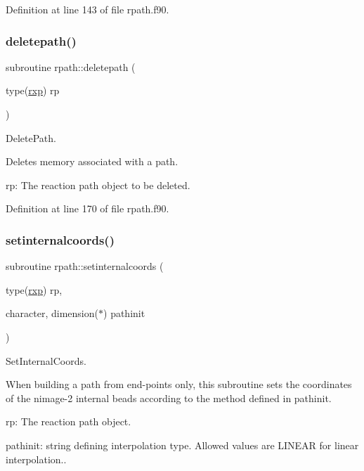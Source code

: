 Definition at line 143 of file rpath.\+f90.

\mbox{\label{namespacerpath_acc28b3649c7753a676d4d6c4e6635286}} 
\subsubsection{\texorpdfstring{deletepath()}{deletepath()}}
{\footnotesize\ttfamily subroutine rpath\+::deletepath (\begin{DoxyParamCaption}\item[{type(\mbox{\hyperlink{structrpath_1_1rxp}{rxp}})}]{rp }\end{DoxyParamCaption})}



Delete\+Path. 

Deletes memory associated with a path.


\begin{DoxyItemize}
\item rp\+: The reaction path object to be deleted. 
\end{DoxyItemize}

Definition at line 170 of file rpath.\+f90.

\mbox{\label{namespacerpath_a14303787a571dd0cb770f37003d45bc6}} 
\subsubsection{\texorpdfstring{setinternalcoords()}{setinternalcoords()}}
{\footnotesize\ttfamily subroutine rpath\+::setinternalcoords (\begin{DoxyParamCaption}\item[{type(\mbox{\hyperlink{structrpath_1_1rxp}{rxp}})}]{rp,  }\item[{character, dimension($\ast$)}]{pathinit }\end{DoxyParamCaption})}



Set\+Internal\+Coords. 

When building a path from end-\/points only, this subroutine sets the coordinates of the nimage-\/2 internal beads according to the method defined in pathinit.


\begin{DoxyItemize}
\item rp\+: The reaction path object.
\item pathinit\+: string defining interpolation type. Allowed values are \textquotesingle{}L\+I\+N\+E\+AR\textquotesingle{} for linear interpolation.. 
\end{DoxyItemize}

